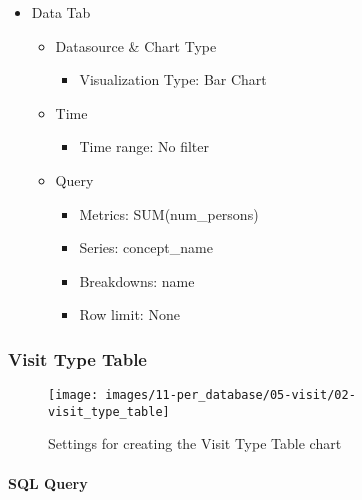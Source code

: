 \documentclass[
]{book}
\providecommand{\tightlist}{%
  \setlength{\itemsep}{0pt}\setlength{\parskip}{0pt}}
\begin{document}
\begin{itemize}
\tightlist
\item
  Data Tab

  \begin{itemize}
  \tightlist
  \item
    Datasource \& Chart Type

    \begin{itemize}
    \tightlist
    \item
      Visualization Type: Bar Chart
    \end{itemize}
  \item
    Time

    \begin{itemize}
    \tightlist
    \item
      Time range: No filter
    \end{itemize}
  \item
    Query

    \begin{itemize}
    \tightlist
    \item
      Metrics: SUM(num\_persons)
    \item
      Series: concept\_name
    \item
      Breakdowns: name
    \item
      Row limit: None
    \end{itemize}
  \end{itemize}
\end{itemize}

\hypertarget{visit-type-table}{%
\subsubsection*{Visit Type Table}\label{visit-type-table}}

\begin{figure}
\texttt{[image: images/11-per\_database/05-visit/02-visit\_type\_table]} \caption{Settings for creating the Visit Type Table chart}\label{fig:visitTypeTable}
\end{figure}

\hypertarget{sql-query-6}{%
\paragraph*{SQL Query}\label{sql-query-6}}
\end{document}
